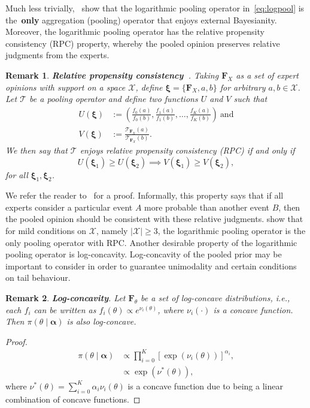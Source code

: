 \documentclass[a4paper, notitlepage, 10pt]{article}
\newtheorem{remark}{Remark}[]
\begin{document}
Much less trivially,~\cite{genest1984} show that the logarithmic pooling operator in~\ref{eq:logpool} is the~\textbf{only} aggregation (pooling) operator that enjoys external Bayesianity.
Moreover, the logarithmic pooling operator has the relative propensity consistency (RPC) property, whereby the pooled opinion preserves relative judgments from the experts.
\begin{remark}
\textbf{Relative propensity consistency~\citep{genest1984}}.
Taking $\boldsymbol F_{X}$ as a set of expert opinions with support on a space $\mathcal{X}$, define $\boldsymbol \xi = \{\boldsymbol F_{X}, a, b\}$ for arbitrary $a , b \in \mathcal{X}$.
Let $\mathcal{T}$ be a pooling operator and define two functions $U$ and $V$ such that 
\begin{align}
 U(\boldsymbol \xi) &:= \left( \frac{f_0(a)}{f_0(b)}, \frac{f_1(a)}{f_1(b)}, \ldots, \frac{f_K(a)}{f_K(b)} \right)\:\text{and}\\
 V(\boldsymbol \xi) & := \frac{\mathcal{T}_{\boldsymbol F_{X}} (a)}{\mathcal{T}_{\boldsymbol F_{X}} (b)}.
\end{align}
We then say that $\mathcal{T}$ enjoys \textit{relative propensity consistency} (RPC) if and only if
\begin{equation}
 U(\boldsymbol \xi_1) \geq U(\boldsymbol \xi_2) \implies  V(\boldsymbol \xi_1) \geq V(\boldsymbol \xi_2),
\end{equation}
for all $\boldsymbol \xi_1, \boldsymbol \xi_2$.

\end{remark}
We refer the reader to~\cite{genest1984} for a proof.
Informally, this property says that if all experts consider a particular event $A$ more probable than another event $B$, then the pooled opinion should be consistent with these relative judgments. 
\cite{genest1984} show that for mild conditions on $\mathcal{X}$, namely $|\mathcal{X}| \geq 3$, the logarithmic pooling operator is the only pooling operator with RPC.
Another desirable property of the logarithmic pooling operator is log-concavity.
Log-concavity of the pooled prior may be important to consider in order to guarantee unimodality and certain conditions on tail behaviour.
\begin{remark}
\label{rmk:concavity}
\textbf{Log-concavity}. 
 Let $\mathbf{F}_{\theta}$ be a set of log-concave distributions, i.e., each $f_i$ can be written as $ f_i(\theta) \propto e^{\nu_i(\theta)}$, where $\nu_i(\cdot)$ is a concave function.
Then $\pi(\theta\mid \boldsymbol \alpha)$ is also log-concave.
\end{remark}
\begin{proof}
\begin{align}
 \pi(\theta \mid \boldsymbol \alpha) &\propto \prod_{i=0}^{K} [\exp(\nu_i(\theta))]^{\alpha_i},\\
             &\propto \exp(\nu^{\ast}(\theta)),
\end{align}
 where $\nu^{\ast}(\theta) = \sum_{i=0}^{K}\alpha_i\nu_i(\theta)$ is a concave function due to being a linear combination of concave functions.
\end{proof}
\end{document}
